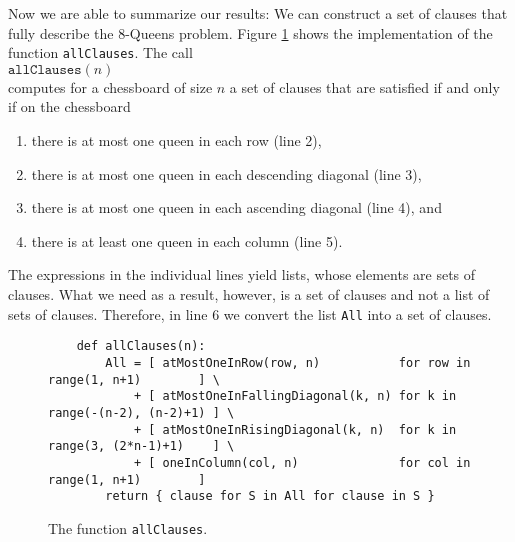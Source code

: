 Now we are able to summarize our results: We can construct a set of clauses that fully describe the 8-Queens problem.
Figure \ref{fig:allClauses} shows the implementation of the function \texttt{allClauses}.
The call \\[0.2cm]
\hspace*{1.3cm} $\texttt{allClauses}(n)$ \\[0.2cm]
computes for a chessboard of size $n$ a set of clauses that
are satisfied if and only if on the chessboard
\begin{enumerate}
\item there is at most one queen in each row (line 2),
\item there is at most one queen in each descending diagonal (line 3),
\item there is at most one queen in each ascending diagonal (line 4), and
\item there is at least one queen in each column (line 5).
\end{enumerate}
The expressions in the individual lines yield lists, whose elements
are sets of clauses. What we need as a result, however, is a set of clauses
and not a list of sets of clauses. Therefore, in line 6 we convert the list \texttt{All} into a set of
clauses.

\begin{figure}[!ht]
  \centering
\begin{verbatim}
    def allClauses(n):
        All = [ atMostOneInRow(row, n)           for row in range(1, n+1)        ] \
            + [ atMostOneInFallingDiagonal(k, n) for k in range(-(n-2), (n-2)+1) ] \
            + [ atMostOneInRisingDiagonal(k, n)  for k in range(3, (2*n-1)+1)    ] \
            + [ oneInColumn(col, n)              for col in range(1, n+1)        ]
        return { clause for S in All for clause in S }
\end{verbatim}
\vspace*{-0.3cm}
  \caption{The function \texttt{allClauses}.}
  \label{fig:allClauses}
\end{figure}

